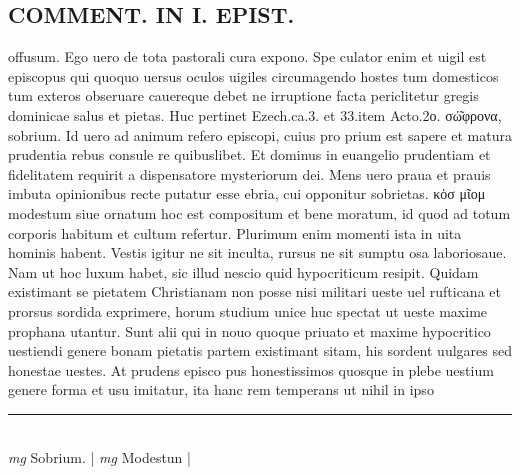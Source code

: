 \documentclass{article}
\begin{document}
\begin{pages}
\section*{COMMENT. IN I. EPIST. }\pstart offusum. Ego uero de tota pastorali cura expono. Spe culator enim et uigil est episcopus qui quoquo uersus oculos uigiles circumagendo hostes tum domesticos tum exteros obseruare cauereque debet ne irruptione facta periclitetur gregis dominicae salus et pietas. Huc pertinet Ezech.ca.3. et 33.item Acto.2ο. σώ͂φρονα, sobrium. Id uero ad animum refero episcopi, cuius pro prium est sapere et matura prudentia rebus consule re quibuslibet. Et dominus in euangelio prudentiam et fidelitatem requirit a dispensatore mysteriorum dei. Mens uero praua et prauis imbuta opinionibus recte putatur esse ebria, cui opponitur sobrietas. κὁσ μῖομ modestum siue ornatum hoc est compositum et bene moratum, id quod ad totum corporis habitum et cultum refertur. Plurimum enim momenti ista in uita hominis habent. Vestis igitur ne sit inculta, rursus ne sit sumptu osa laboriosaue. Nam ut hoc luxum habet, sic illud nescio quid hypocriticum resipit. Quidam existimant se pietatem Christianam non posse nisi militari ueste uel rufticana et prorsus sordida exprimere, horum studium unice huc spectat ut ueste maxime prophana utantur. Sunt alii qui in nouo quoque priuato et maxime hypocritico uestiendi genere bonam pietatis partem existimant sitam, his sordent uulgares sed honestae uestes. At prudens episco pus honestissimos quosque in plebe uestium genere forma et usu imitatur, ita hanc rem temperans ut nihil in ipso  \pend
\vspace{0.5cm}\noindent
\vspace{0.2cm}\rule{1cm}{0.2pt}\\ 
\hspace{0.2cm}\textit{mg}
\footnotesize Sobrium. 
\normalsize| 
\hspace{0.2cm}\textit{mg}
\footnotesize Modestun 
\normalsize| 

\end{pages}
\end{document}
